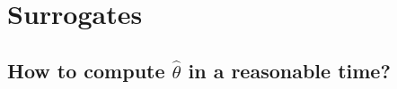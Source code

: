 \documentclass[11pt]{beamer}
\DeclareMathOperator*{\argmin}{arg\,min}
\newcommand{\kk}{\theta}
\newcommand{\uu}{u}
\begin{document}


\section{Surrogates}
\subsection{\small{How to compute $\hat{\kk}$ in a reasonable time?}}

\end{document}
